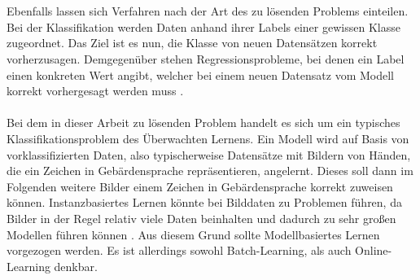 \documentclass[11pt,bibliography=totocnumbered]{scrartcl}
\begin{document}
\\\\
Ebenfalls lassen sich Verfahren nach der Art des zu lösenden Problems einteilen. Bei der Klassifikation werden Daten anhand ihrer Labels einer gewissen Klasse zugeordnet. Das Ziel ist es nun, die Klasse von neuen Datensätzen korrekt vorherzusagen. Demgegenüber stehen Regressionsprobleme, bei denen ein Label einen konkreten Wert angibt, welcher bei einem neuen Datensatz vom Modell korrekt vorhergesagt werden muss \cite[S.8-9]{MACHINE_LEARNING}\cite[S.2]{BA}.
\\\\
Bei dem in dieser Arbeit zu lösenden Problem handelt es sich um ein typisches Klassifikationsproblem des Überwachten Lernens. Ein Modell wird auf Basis von vorklassifizierten Daten, also typischerweise Datensätze mit Bildern von Händen, die ein Zeichen in Gebärdensprache repräsentieren, angelernt. Dieses soll dann im Folgenden weitere Bilder einem Zeichen in Gebärdensprache korrekt zuweisen können. Instanzbasiertes Lernen könnte bei Bilddaten zu Problemen führen, da Bilder in der Regel relativ viele Daten beinhalten und dadurch zu sehr großen Modellen führen können \cite[S.18]{MACHINE_LEARNING}. Aus diesem Grund sollte Modellbasiertes Lernen vorgezogen werden. Es ist allerdings sowohl Batch-Learning, als auch Online-Learning denkbar.
\end{document}
